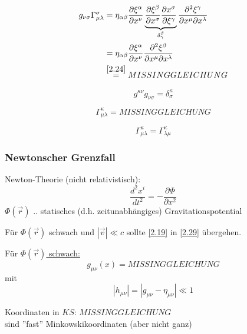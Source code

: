 \documentclass[a4paper, 11pt]{article}
\numberwithin{equation}{section}
\begin{document}
\begin{equation}
\begin{aligned}
g_{\nu \sigma} \Gamma^\sigma_{\mu \lambda} &= \eta_{\alpha \beta} \dfrac{\partial\xi^\alpha}{\partial x ^\nu} \underbrace{\dfrac{\partial \xi^\beta}{\partial x^\sigma} \dfrac{\partial x^\sigma}{\partial \xi^\gamma}}_{\delta^\beta_\gamma} \dfrac{\partial^2 \xi^\gamma}{\partial x^\mu \partial x^\lambda} \\
&= \eta_{\alpha \beta} \dfrac{\partial\xi^\alpha}{\partial x ^\nu} \dfrac{\partial^2 \xi^\beta}{\partial x^\mu \partial x^\lambda} \\
&\overset{\ref{2.24}}{=} MISSING GLEICHUNG
\end{aligned}
\end{equation}

\begin{equation}
g^{\kappa \nu} g_{\nu \sigma} = \delta^\kappa_\sigma
\end{equation}

\begin{equation}
\boxed{
\Gamma^\kappa_{\mu \lambda} = MISSING GLEICHUNG}
\end{equation}


\begin{equation}
\Gamma^\kappa_{\mu \lambda} = \Gamma^\kappa_{\lambda \mu}
\end{equation}


\subsubsection*{Newtonscher Grenzfall}
Newton-Theorie (nicht relativistisch):
\begin{equation}
\dfrac{d^2x^i}{dt^2} = - \dfrac{\partial \Phi}{\partial x^2}
\end{equation}
$\Phi(\vec{r})$ $..$ statisches (d.h. zeitunabhängiges) Gravitationspotential

Für $\Phi(\vec{r})$ schwach und $|\vec{v}| \ll c$ sollte \ref{2.19} in \ref{2.29} übergehen.

Für \underline{$\Phi(\vec{r})$ schwach:}
\begin{equation}
g_{\mu \nu}(x) = MISSING GLEICHUNG
\end{equation}
mit
\begin{equation}
|h_{\mu \nu}| = | g_{\mu \nu} - \eta _{\mu \nu}| \ll 1
\end{equation}

Koordinaten in $KS$: $MISSING GLEICHUNG$\\
sind ''fast'' Minkowskikoordinaten (aber nicht ganz)
\end{document}
